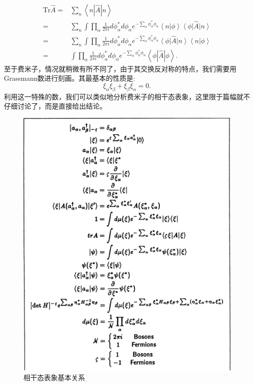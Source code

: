 \documentclass[12pt, a4paper, oneside]{ctexart}
\begin{document}
\begin{align} 
\mathrm{Tr}\hat A=&\sum_{n}\left<n |\hat A| n\right>\nonumber\\
 =&\sum_n\int \prod_\alpha \frac{1}{2\pi i}d\phi^*_{\alpha}d\phi_{\alpha}e^{-\sum_\alpha \phi^*_{\alpha}\phi_{\alpha}}\left< n |  \phi \right> \left<  \phi\right|\hat A\left| n\right>\nonumber\\ 
 =&\sum_n\int \prod_\alpha \frac{1}{2\pi i}d\phi^*_{\alpha}d\phi_{\alpha}e^{-\sum_\alpha \phi^*_{\alpha}\phi_{\alpha}} \left<  \phi\right|\hat A\left| n\right>\left< n |  \phi \right>\nonumber\\ 
 =&\int \prod_\alpha \frac{1}{2\pi i}d\phi^*_{\alpha}d\phi_{\alpha}e^{-\sum_\alpha \phi^*_{\alpha}\phi_{\alpha}} \left<  \phi|\hat A| \phi \right>.
\end{align}
至于费米子，情况就稍微有所不同了，由于其交换反对称的特点，我们需要用Grassmann数进行刻画。其最基本的性质是:
\begin{equation}
    \xi_\alpha \xi_\beta+\xi_\beta\xi_\alpha=0.
\end{equation}
利用这一特殊的数，我们可以类似地分析费米子的相干态表象，这里限于篇幅就不仔细讨论了，而是直接给出结论。
\begin{figure}[h!]
    \centering
    \includegraphics[width=1\textwidth]{coherent_relation.png}
    \caption{相干态表象基本关系\cite{a}}
\end{figure}
\end{document}
